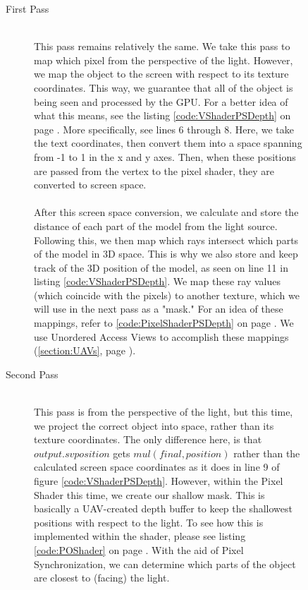 \documentclass[a4paper, 12pt]{article}
\begin{document}
\begin{figure}[h!]

\begin{description} 

\item[First Pass] \hfill \\ 

This pass remains relatively the same. We take this pass to map which pixel
from the perspective of the light. However, we map the object to the screen
with respect to its texture coordinates. This way, we guarantee that all of
the object is being seen and processed by the GPU. For a better idea of what
this means, see the listing \ref{code:VShaderPSDepth} on page
\pageref{code:VShaderPSDepth}. More specifically, see lines 6 through 8. Here,
we take the text coordinates, then convert them into a space spanning from -1
to 1 in the x and y axes. Then, when these positions are passed from the
vertex to the pixel shader, they are converted to screen space. \\ \\ After
this screen space conversion, we calculate and store the distance of each part
of the model from the light source. Following this, we then map which rays
intersect which parts of the model in 3D space. This is why we also store and
keep track of the 3D position of the model, as seen on line 11 in listing
\ref{code:VShaderPSDepth}. We map these ray values (which coincide with the
pixels) to another texture, which we will use in the next pass as a "mask."
For an idea of these mappings, refer to \ref{code:PixelShaderPSDepth} on page
\pageref{code:PixelShaderPSDepth}. We use Unordered Access Views to accomplish
these mappings (\ref{section:UAVs}, page \pageref{section:UAVs}).

\item[Second Pass] \hfill \\  

This pass is from the perspective of the light, but this time, we project the
correct object into space, rather than its texture coordinates. The only
difference here, is that $output.svposition$ gets $mul(final, position)$
rather than the calculated screen space coordinates as it does in line 9 of
figure \ref{code:VShaderPSDepth}. However, within the Pixel Shader this time,
we create our shallow mask. This is basically a UAV-created depth buffer to
keep the shallowest positions with respect to the light. To see how this is
implemented within the shader, please see listing \ref{code:POShader} on page
\pageref{code:POShader}. With the aid of Pixel Synchronization, we can determine which parts of the object are closest to (facing) the light.


\end{description}
\end{figure}
\end{document}
